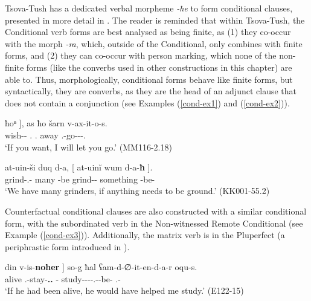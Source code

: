Tsova-Tush has a dedicated verbal morpheme \textit{-ħe} to form conditional clauses, presented in more detail in . The reader is reminded that within Tsova-Tush, the  Conditional verb forms are best analysed as being finite, as (1) they co-occur with the morph \textit{-ra}, which, outside of the Conditional, only combines with finite forms, and (2) they can co-occur with person marking, which none of the non-finite forms (like the converbs used in other constructions in this chapter) are able to. Thus, morphologically, conditional forms behave like finite forms, but syntactically, they are converbs, as they are the head of an adjunct clause that does not contain a conjunction (see Examples (\ref{cond-ex1}) and (\ref{cond-ex2})).


	\begin{exe}
		\ex\label{cond-ex1}
		\gll {{\normalfont[} leɁ-e-\textbf{ħ}} 	{ħoⁿ {\normalfont]}},	as	ħo	šarn	v-ax-it-o-s.    \\
		wish-{\Npst}-\textbf{{\Cond}}	{\Ssg}.{\Dat}	{\Fsg}.{\Erg}	{\Ssg}	away	{\M}.{\Sg}-go-{\Caus}-{\Npst}-{\Fsg}.{\Erg}   \\
		\trans `If you want, I will let you go.’	
		\hfill (MM116-2.18)
	\end{exe}



	\begin{exe}
		\ex\label{cond-ex2}
		\gll at-uin-ši	duq	d-a,	{{\normalfont[} at-uinĭ}	wum	{d-a-\textbf{ħ} {\normalfont]}}.  \\
		grind-{\Ptcp}.{\Npst}-{\Pl}	many	{\D}-be	grind-{\Ptcp}-{\Npst}	something   {\D}-be-\textbf{{\Cond}}   \\
		\trans ‘We have many grinders, if anything needs to be ground.’
		\hfill (KK001-55.2)
	\end{exe}


Counterfactual conditional clauses are also constructed with a similar conditional form, with the subordinated verb in the Non-witnessed Remote Conditional (see Example (\ref{cond-ex3})). Additionally, the matrix verb is in the Pluperfect (a periphrastic form introduced in ).


	\begin{exe}
		\ex\label{cond-ex3}
		\gll {{\normalfont[} o}	din	{v-is-\textbf{noħer} {\normalfont]}}	so-g	ħal	ʕam-d-∅-it-en-d-a-r	oqu-s.  \\
		{\Dist}	alive	{\M}.{\Sg}-stay-\textbf{{\Nw}.{\Rem}.{\Cond}}	{\Fsg}-{\All}	{\Pv} study-{\D}-{\Tr}-{\Caus}-{\Ptcp}.{\Pst}-{\D}-be-{\Imprf}	{\Dist}.{\Obl}-{\Erg}    \\
		\trans `If he had been alive, he would have helped me study.’
		\hfill (E122-15)
	\end{exe}



